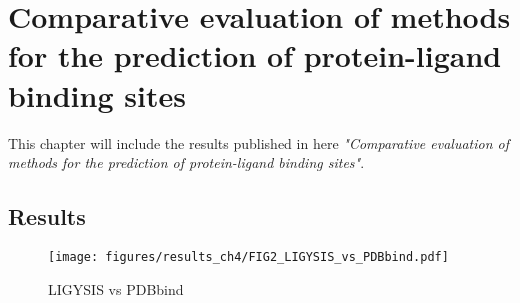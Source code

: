 \chapter{Comparative evaluation of methods for the prediction of protein-ligand binding sites}

This chapter will include the results published in here \textit{"Comparative evaluation of methods for the prediction of protein-ligand binding sites"}.

\section{Results}

\begin{figure}
    \centering
    \texttt{[image: figures/results\_ch4/FIG2\_LIGYSIS\_vs\_PDBbind.pdf]}
    \caption{LIGYSIS vs PDBbind}
    \label{fig:ligysis_vs_pdbbind}
\end{figure}